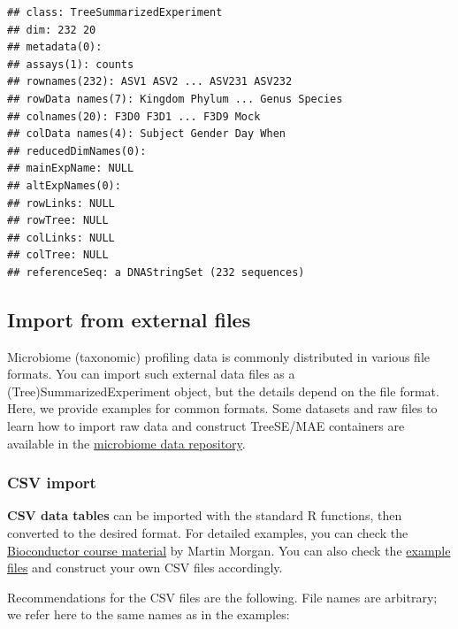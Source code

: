 \documentclass[
]{book}
\begin{document}
\begin{verbatim}
## class: TreeSummarizedExperiment 
## dim: 232 20 
## metadata(0):
## assays(1): counts
## rownames(232): ASV1 ASV2 ... ASV231 ASV232
## rowData names(7): Kingdom Phylum ... Genus Species
## colnames(20): F3D0 F3D1 ... F3D9 Mock
## colData names(4): Subject Gender Day When
## reducedDimNames(0):
## mainExpName: NULL
## altExpNames(0):
## rowLinks: NULL
## rowTree: NULL
## colLinks: NULL
## colTree: NULL
## referenceSeq: a DNAStringSet (232 sequences)
\end{verbatim}

\hypertarget{import-from-file}{%
\subsection{Import from external files}\label{import-from-file}}

Microbiome (taxonomic) profiling data is commonly distributed in
various file formats. You can import such external data files as a
(Tree)SummarizedExperiment object, but the details depend on the file
format. Here, we provide examples for common formats. Some datasets and raw
files to learn how to import raw data and construct TreeSE/MAE containers are
available in the
\href{https://github.com/microbiome/data}{microbiome data repository}.

\hypertarget{csv-import}{%
\subsubsection{CSV import}\label{csv-import}}

\textbf{CSV data tables} can be imported with the standard R functions,
then converted to the desired format. For detailed examples, you can
check the \href{https://bioconductor.org/help/course-materials/2019/BSS2019/04_Practical_CoreApproachesInBioconductor.html}{Bioconductor course
material}
by Martin Morgan. You can also check the \href{https://github.com/microbiome/OMA/tree/master/data}{example
files} and
construct your own CSV files accordingly.

Recommendations for the CSV files are the following. File names are
arbitrary; we refer here to the same names as in the examples:
\end{document}
